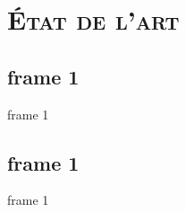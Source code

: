 
\section{\scshape État de l'art}
\subsection{frame 1}
\begin{frame}{frame 1}

\end{frame}


\subsection{frame 1}
\begin{frame}{frame 1}

\end{frame}
